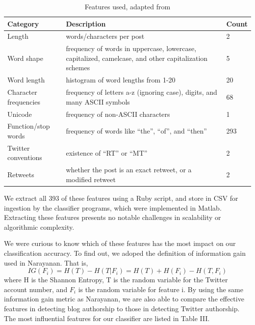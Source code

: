 \documentclass[10pt, conference, compsocconf]{IEEEtran}
\begin{document}
\begin{table}[h]
  \centering
  \begin{tabularx}{\linewidth}{l X l}
    \toprule
    \bf{Category} & \bf{Description} & \bf{Count} \\ \midrule
    Length & words/characters per post & 2 \\ \midrule
    Word shape & frequency of words in uppercase, lowercase, capitalized, camelcase, and other capitalization schemes & 5 \\ \midrule
    Word length & histogram of word lengths from 1-20 & 20 \\ \midrule
    Character frequencies & frequency of letters a-z (ignoring case), digits, and many ASCII symbols & 68 \\ \midrule
    Unicode & frequency of non-ASCII characters & 1 \\ \midrule
    Function/stop words & frequency of words like ``the'', ``of'', and ``then'' & 293 \\ \midrule
    Twitter conventions & existence of ``RT'' or ``MT'' & 2 \\ \midrule
    Retweets & whether the post is an exact retweet, or a modified retweet & 2 \\
    \bottomrule
  \end{tabularx}
  \caption{Features used, adapted from \cite{Narayanan}}
\end{table}
We extract all 393 of these features using a Ruby script, and
store in CSV for ingestion by the classifier programs, which were
implemented in Matlab. Extracting these features presents no notable challenges in scalability or algorithmic complexity.

We were curious to know which of these features has the most impact on
our classification accuracy. To find out, we adoped the definition of
information gain used in Narayanan. That is,
$$IG(F_{i}) = H(T) - H(T|F_{i}) = H(T) + H(F_{i}) - H(T, F_{i})$$
where H is the Shannon Entropy, T is the random variable for the
Twitter account number, and $F_{i}$ is the random variable for feature
i\cite{Narayanan}. By using the same information gain metric as
Narayanan, we are also able to compare the effective features in
detecting blog authorship to those in detecting Twitter
authorship. The most influential features for our classifier are listed
in Table III.
\end{document}
